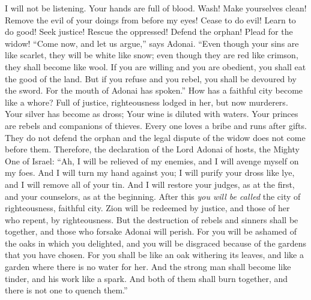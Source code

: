 \begin{biblechapter}
I will not be listening. 
Your hands are full of blood.
\verse Wash! Make yourselves clean! 
Remove the evil of your doings from before my eyes! 
Cease to do evil!
\verse Learn to do good! 
Seek justice! Rescue the oppressed! 
Defend the orphan! Plead for the widow!
\verse “Come now, and let us argue,” says Adonai. 
“Even though your sins are like scarlet, they will be white like snow; 
even though they are red like crimson, they shall become like wool.
\verse If you are willing and you are obedient, 
you shall eat the good of the land.
\verse But if you refuse and you rebel, you shall be devoured by the sword. For the mouth of Adonai has spoken.”
 How has a faithful city become like a whore? 
Full of justice, righteousness lodged in her, but now murderers.
\verse Your silver has become as dross; 
Your wine is diluted with waters.
\verse Your princes are rebels 
and companions of thieves. 
Every one loves a bribe 
and runs after gifts. 
They do not defend the orphan 
and the legal dispute of the widow does not come before them.
\verse Therefore, the declaration of the Lord Adonai of hosts, the Mighty One of Israel: 
“Ah, I will be relieved of my enemies, 
and I will avenge myself on my foes.
\verse And I will turn my hand against you; 
I will purify your dross like lye, 
and I will remove all of your tin.
\verse And I will restore your judges, as at the first, 
and your counselors, as at the beginning. 
After this \textit{you will be called} the city of righteousness, 
faithful city.
\verse Zion will be redeemed by justice, 
and those of her who repent, by righteousness.
\verse But the destruction of rebels and sinners shall be together, 
and those who forsake Adonai will perish.
\verse For you will be ashamed of the oaks in which you delighted, 
and you will be disgraced because of the gardens that you have chosen.
\verse For you shall be like an oak withering its leaves, 
and like a garden where there is no water for her.
\verse And the strong man shall become like tinder, 
and his work like a spark. 
And both of them shall burn together, 
and there is not one to quench them.”
\end{biblechapter}

